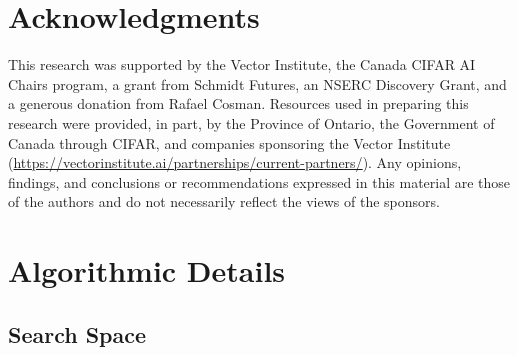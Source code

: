 \documentclass{article}
\theoremstyle{plain}
\theoremstyle{definition}
\theoremstyle{remark}
\begin{document}
\section*{Acknowledgments}
This research was supported by the Vector Institute, the Canada CIFAR AI Chairs program, a grant from Schmidt Futures, an NSERC Discovery Grant, and a generous donation from Rafael Cosman. Resources used in preparing this research were provided, in part, by the Province of Ontario, the Government of Canada through CIFAR, and companies sponsoring the Vector Institute (\url{https://vectorinstitute.ai/partnerships/current-partners/}). Any opinions, findings, and conclusions or recommendations expressed in this material are those of the authors and do not necessarily reflect the views of the sponsors.

\nocite{langley00}




\newpage
\appendix
\onecolumn

\section{Algorithmic Details}
\subsection{Search Space}
\label{search_space}

\end{document}

